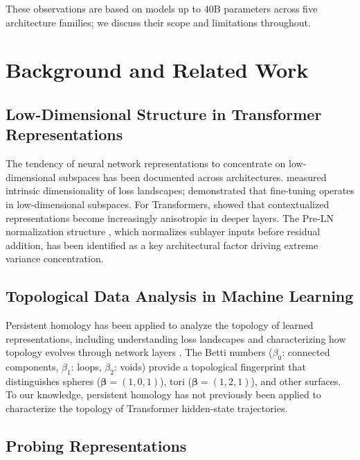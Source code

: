 \documentclass[11pt,a4paper]{article}
\begin{document}
These observations are based on models up to 40B parameters across five architecture families; we discuss their scope and limitations throughout.

\section{Background and Related Work}

\subsection{Low-Dimensional Structure in Transformer Representations}

The tendency of neural network representations to concentrate on low-dimensional subspaces has been documented across architectures. \citet{li2018measuring} measured intrinsic dimensionality of loss landscapes; \citet{aghajanyan2021intrinsic} demonstrated that fine-tuning operates in low-dimensional subspaces. For Transformers, \citet{ethayarajh2019contextual} showed that contextualized representations become increasingly anisotropic in deeper layers. The Pre-LN normalization structure \citep{xiong2020layer}, which normalizes sublayer inputs before residual addition, has been identified as a key architectural factor driving extreme variance concentration.

\subsection{Topological Data Analysis in Machine Learning}

Persistent homology \citep{edelsbrunner2010computational} has been applied to analyze the topology of learned representations, including understanding loss landscapes \citep{rieck2019neural} and characterizing how topology evolves through network layers \citep{naitzat2020topology}. The Betti numbers ($\beta_0$: connected components, $\beta_1$: loops, $\beta_2$: voids) provide a topological fingerprint that distinguishes spheres ($\boldsymbol{\beta} = (1, 0, 1)$), tori ($\boldsymbol{\beta} = (1, 2, 1)$), and other surfaces. To our knowledge, persistent homology has not previously been applied to characterize the topology of Transformer hidden-state trajectories.

\subsection{Probing Representations}
\end{document}

